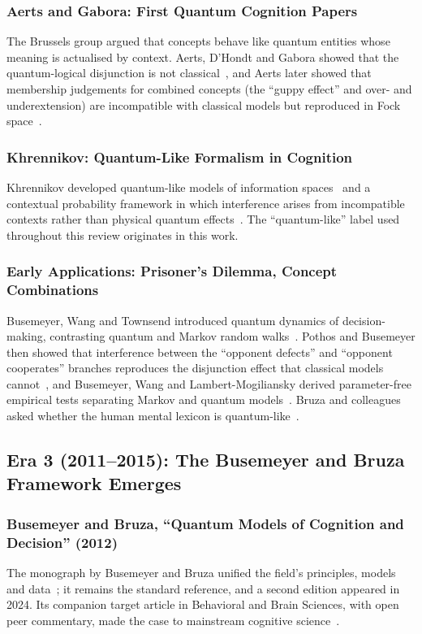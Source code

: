 \documentclass[pdflatex,sn-basic]{sn-jnl}
\begin{document}
\subsubsection{Aerts and Gabora: First Quantum Cognition Papers}
The Brussels group argued that concepts behave like quantum entities whose meaning is actualised by context. Aerts, D'Hondt and Gabora showed that the quantum-logical disjunction is not classical~\citep{Aerts2000}, and Aerts later showed that membership judgements for combined concepts (the ``guppy effect'' and over- and underextension) are incompatible with classical models but reproduced in Fock space~\citep{Aerts2009}.

\subsubsection{Khrennikov: Quantum-Like Formalism in Cognition}
Khrennikov developed quantum-like models of information spaces~\citep{Khrennikov1999} and a contextual probability framework in which interference arises from incompatible contexts rather than physical quantum effects~\citep{Khrennikov2010}. The ``quantum-like'' label used throughout this review originates in this work.

\subsubsection{Early Applications: Prisoner's Dilemma, Concept Combinations}
Busemeyer, Wang and Townsend introduced quantum dynamics of decision-making, contrasting quantum and Markov random walks~\citep{Busemeyer2006}. Pothos and Busemeyer then showed that interference between the ``opponent defects'' and ``opponent cooperates'' branches reproduces the disjunction effect that classical models cannot~\citep{Pothos2009}, and Busemeyer, Wang and Lambert-Mogiliansky derived parameter-free empirical tests separating Markov and quantum models~\citep{Busemeyer2009}. Bruza and colleagues asked whether the human mental lexicon is quantum-like~\citep{Bruza2009}.

\subsection{Era 3 (2011--2015): The Busemeyer and Bruza Framework Emerges}\label{sec:era3}

\subsubsection{Busemeyer and Bruza, ``Quantum Models of Cognition and Decision'' (2012)}
The monograph by Busemeyer and Bruza unified the field's principles, models and data~\citep{Busemeyer2012}; it remains the standard reference, and a second edition appeared in 2024. Its companion target article in Behavioral and Brain Sciences, with open peer commentary, made the case to mainstream cognitive science~\citep{Pothos2013a}.
\end{document}
